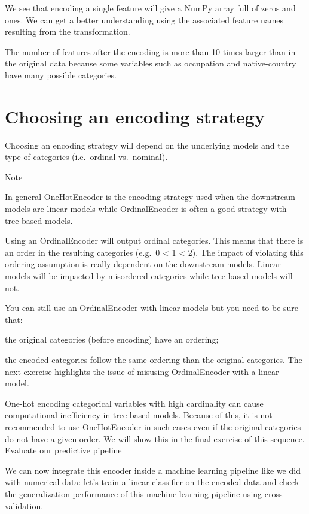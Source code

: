 \documentclass[
  letterpaper,
  DIV=11,
  numbers=noendperiod,
  oneside]{scrreprt}
\begin{document}
We see that encoding a single feature will give a NumPy array full of
zeros and ones. We can get a better understanding using the associated
feature names resulting from the transformation.

The number of features after the encoding is more than 10 times larger
than in the original data because some variables such as occupation and
native-country have many possible categories.

\hypertarget{choosing-an-encoding-strategy}{%
\section{Choosing an encoding
strategy}\label{choosing-an-encoding-strategy}}

Choosing an encoding strategy will depend on the underlying models and
the type of categories (i.e.~ordinal vs.~nominal).

Note

In general OneHotEncoder is the encoding strategy used when the
downstream models are linear models while OrdinalEncoder is often a good
strategy with tree-based models.

Using an OrdinalEncoder will output ordinal categories. This means that
there is an order in the resulting categories (e.g.~0 \textless{} 1
\textless{} 2). The impact of violating this ordering assumption is
really dependent on the downstream models. Linear models will be
impacted by misordered categories while tree-based models will not.

You can still use an OrdinalEncoder with linear models but you need to
be sure that:

the original categories (before encoding) have an ordering;

the encoded categories follow the same ordering than the original
categories. The next exercise highlights the issue of misusing
OrdinalEncoder with a linear model.

One-hot encoding categorical variables with high cardinality can cause
computational inefficiency in tree-based models. Because of this, it is
not recommended to use OneHotEncoder in such cases even if the original
categories do not have a given order. We will show this in the final
exercise of this sequence. Evaluate our predictive pipeline

We can now integrate this encoder inside a machine learning pipeline
like we did with numerical data: let's train a linear classifier on the
encoded data and check the generalization performance of this machine
learning pipeline using cross-validation.
\end{document}
